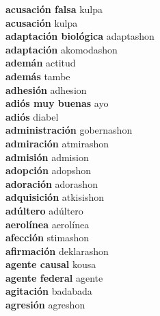 \textbf{ acusación falsa  } kulpa \\
\textbf{ acusación  } kulpa \\
\textbf{ adaptación biológica  } adaptashon \\
\textbf{ adaptación  } akomodashon \\
\textbf{ ademán  } actitud \\
\textbf{ además  } tambe \\
\textbf{ adhesión  } adhesion \\
\textbf{ adiós muy buenas  } ayo \\
\textbf{ adiós  } diabel \\
\textbf{ administración  } gobernashon \\
\textbf{ admiración  } atmirashon \\
\textbf{ admisión  } admision \\
\textbf{ adopción  } adopshon \\
\textbf{ adoración  } adorashon \\
\textbf{ adquisición  } atkisishon \\
\textbf{ adúltero  } adúltero \\
\textbf{ aerolínea  } aerolínea \\
\textbf{ afección  } stimashon \\
\textbf{ afirmación  } deklarashon \\
\textbf{ agente causal  } kousa \\
\textbf{ agente federal  } agente \\
\textbf{ agitación  } badabada \\
\textbf{ agresión  } agreshon \\
